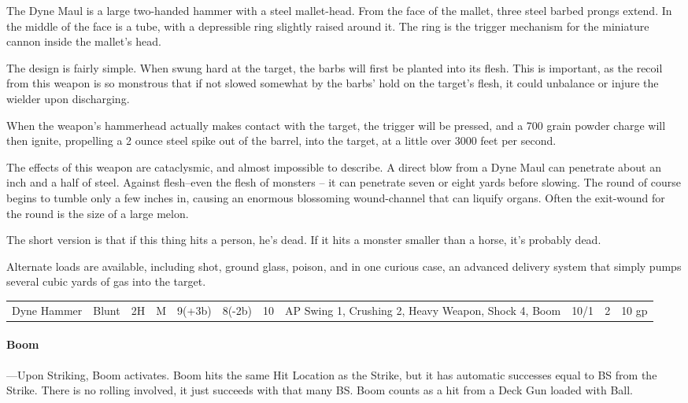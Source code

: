 \documentclass[oneside,11pt,english]{book}
\begin{document}
The Dyne Maul is a large two-handed hammer with a steel mallet-head. From the face of the 
mallet, three steel barbed prongs extend. In the middle of the face is a tube, with a depressible 
ring slightly raised around it. The ring is the trigger mechanism for the miniature cannon inside 
the mallet’s head. 

The design is fairly simple. When swung hard at the target, the barbs will first be planted into its 
flesh. This is important, as the recoil from this weapon is so monstrous that if not slowed 
somewhat by the barbs’ hold on the target’s flesh, it could unbalance or injure the wielder upon 
discharging. 

When the weapon’s hammerhead actually makes contact with the target, the trigger will be 
pressed, and a 700 grain powder charge will then ignite, propelling a 2 ounce steel spike out of 
the barrel, into the target, at a little over 3000 feet per second. 

The effects of this weapon are cataclysmic, and almost impossible to describe. A direct blow 
from a Dyne Maul can penetrate about an inch and a half of steel. Against flesh--even the flesh 
of monsters -- it can penetrate seven or eight yards
before slowing. The round of course begins 
to tumble only a few inches in, causing an enormous blossoming wound-channel that can liquify
organs. Often the exit-wound for the round is the size of a large melon. 

The short version is that if this thing hits a person, he’s dead. If it hits a monster smaller than a 
horse, it’s probably dead. 

Alternate loads are available, including shot, ground glass, poison, and in one curious case, an 
advanced delivery system that simply pumps several cubic yards of gas into the target. 

\begin{tabu} to 
  Dyne Hammer & Blunt &2H & M & 9(+3b) & 8(-2b) & 10 & AP Swing 1, Crushing 2, Heavy Weapon, Shock 4, Boom & 10/1 & 2 & 10 gp\\
\end{tabu}
\paragraph{Boom}
---\quad Upon Striking, Boom activates. Boom hits the same Hit Location as the
Strike, but it has automatic successes equal to BS from the Strike. There is no
rolling involved, it just succeeds with that many BS. Boom counts as a hit from
a Deck Gun loaded with Ball. 
\end{document}
